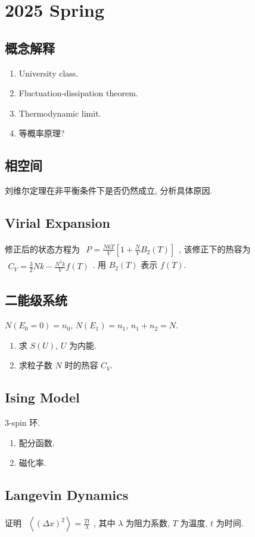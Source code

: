 \documentclass[../../main.tex]{subfiles}
\begin{document}
\section{2025 Spring}
\subsection{概念解释}
\begin{enumerate}
  \item University class.
  \item Fluctuation-dissipation theorem.
  \item Thermodynamic limit.
  \item 等概率原理?
\end{enumerate}

\subsection{相空间}
刘维尔定理在非平衡条件下是否仍然成立, 分析具体原因.

\subsection{Virial Expansion}
修正后的状态方程为 $\begin{aligned}
  P = \frac{NkT}{V}\left[1+\frac{N}{V}B_{2}(T)\right]
\end{aligned}$, 该修正下的热容为 $\begin{aligned}
  C_{V} = \frac{3}{2}Nk - \frac{N^{2}k}{V}f(T)
\end{aligned}$. 用 $B_{2}(T)$ 表示 $f(T)$. 

\subsection{二能级系统}

$N(E_{0} = 0)=n_{0}$, $N(E_{1})=n_{1}$, $n_{1}+n_{2}=N$. 
\begin{enumerate}
  \item 求 $S(U)$, $U$ 为内能.
  \item 求粒子数 $N$ 时的热容 $C_{V}$.
\end{enumerate}

\subsection{Ising Model}

3-spin 环.
\begin{enumerate}
  \item 配分函数.
  \item 磁化率. 
\end{enumerate}

\subsection{Langevin Dynamics}
证明 $\begin{aligned}
  \left\langle (\Delta x)^{2}\right\rangle = \frac{Tt}{\lambda}
\end{aligned}$, 其中 $\lambda$ 为阻力系数, $T$ 为温度, $t$ 为时间.
\end{document}
